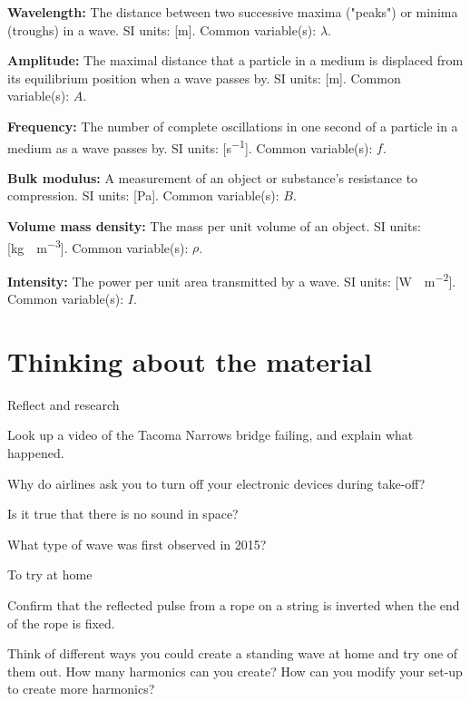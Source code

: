 \begin{definitions}
\item \textbf{Wavelength:} The distance between two successive maxima ("peaks") or minima (troughs) in a wave. SI units: [\si{m}]. Common variable(s): $\lambda$.
\item \textbf{Amplitude:} The maximal distance that a particle in a medium is displaced from its equilibrium position when a wave passes by. SI units: [\si{m}]. Common variable(s): $A$.
\item \textbf{Frequency:} The number of complete oscillations in one second of a particle in a medium as a wave passes by. SI units: [\si{s^{-1}}]. Common variable(s): $f$.
\item \textbf{Bulk modulus:} A measurement of an object or substance's resistance to compression. SI units: [\si{Pa}]. Common variable(s): $B$.
\item \textbf{Volume mass density:} The mass per unit volume of an object. SI units: [\si{kg\cdot m^{-3}}]. Common variable(s): $\rho$.
\item \textbf{Intensity:} The power per unit area transmitted by a wave. SI units: [\si{W\cdot m^{-2}}]. Common variable(s): $I$.
\end{definitions}
\newpage
\section{Thinking about the material}

\begin{chapteractivity}{Reflect and research}
{
\item Look up a video of the Tacoma Narrows bridge failing, and explain what happened.
\item Why do airlines ask you to turn off your electronic devices during take-off?
\item Is it true that there is no sound in space?
\item What type of wave was first observed in 2015?
}
\end{chapteractivity}


\begin{chapteractivity}{To try at home}
{
\item Confirm that the reflected pulse from a rope on a string is inverted when the end of the rope is fixed.
\item Think of different ways you could create a standing wave at home and try one of them out. How many harmonics can you create? How can you modify your set-up to create more harmonics?
}
\end{chapteractivity}

